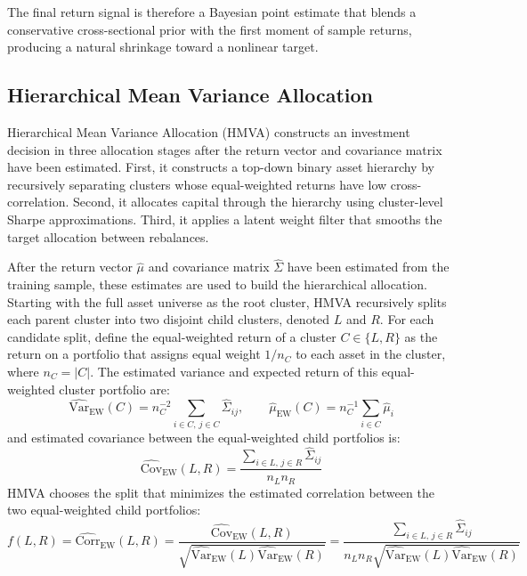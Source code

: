 \documentclass[12pt]{article}
\begin{document}
The final return signal is therefore a Bayesian point estimate that blends a conservative cross-sectional prior with the first moment of sample returns, producing a natural shrinkage toward a nonlinear target.

\subsection{Hierarchical Mean Variance Allocation}
\label{sec:hmva}

Hierarchical Mean Variance Allocation (HMVA) constructs an investment decision in three allocation stages after the return vector and covariance matrix have been estimated. First, it constructs a top-down binary asset hierarchy by recursively separating clusters whose equal-weighted returns have low cross-correlation. Second, it allocates capital through the hierarchy using cluster-level Sharpe approximations. Third, it applies a latent weight filter that smooths the target allocation between rebalances.

After the return vector $\hat{\mu}$ and covariance matrix $\hat{\Sigma}$ have been estimated from the training sample, these estimates are used to build the hierarchical allocation. Starting with the full asset universe as the root cluster, HMVA recursively splits each parent cluster into two disjoint child clusters, denoted $L$ and $R$. For each candidate split, define the equal-weighted return of a cluster $C \in \{L, R \}$ as the return on a portfolio that assigns equal weight $1/n_C$ to each asset in the cluster, where $n_C=|C|$. The estimated variance and expected return of this equal-weighted cluster portfolio are:
\begin{equation}
\widehat{\mathrm{Var}}_{\mathrm{EW}}(C)
=
n_C^{-2}
\sum_{i \in C,\, j \in C}
\hat{\Sigma}_{ij}, 
\qquad
\hat{\mu}_{\mathrm{EW}}(C)
=
n_C^{-1}
\sum_{i \in C}
\hat{\mu}_{i}
\label{eq:obj_mu_sd}
\end{equation}
and estimated covariance between the equal-weighted child portfolios is:
\begin{equation}
\widehat{\mathrm{Cov}}_{\mathrm{EW}}(L,R)
=
\frac{
\sum_{i\in L,\,j\in R}\hat{\Sigma}_{ij}
}{
n_L n_R
}
\label{eq:cluster_covariance}
\end{equation}
HMVA chooses the split that minimizes the estimated correlation between the two equal-weighted child portfolios:
\begin{equation}
f(L,R)
=
\widehat{\mathrm{Corr}}_{\mathrm{EW}}(L,R)
=
\frac{
\widehat{\mathrm{Cov}}_{\mathrm{EW}}(L,R)
}{
\sqrt{
\widehat{\mathrm{Var}}_{\mathrm{EW}}(L)
\widehat{\mathrm{Var}}_{\mathrm{EW}}(R)
}
}
=
\frac{
\sum_{i\in L,\,j\in R}\hat{\Sigma}_{ij}
}{
n_L n_R
\sqrt{
\widehat{\mathrm{Var}}_{\mathrm{EW}}(L)
\widehat{\mathrm{Var}}_{\mathrm{EW}}(R)
}
}
\label{eq:split-obj}
\end{equation}
\end{document}
